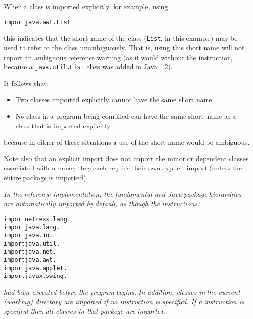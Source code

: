 When a class is imported explicitly, for example, using
\begin{alltt}
import java.awt.List
\end{alltt}
this indicates that the short name of the class (\texttt{List},
in this example) may be used to refer to the class unambiguously.
That is, using this short name will not report an ambiguous reference
warning (as it would without the  instruction, because
a \texttt{java.util.List} class was added in Java 1.2).
 
It follows that:
\begin{itemize}
\item Two classes imported explicitly cannot have the same short name.
\item No class in a program being compiled can have the same short name as
a class that is imported explicitly.
\end{itemize}
because in either of these situations a use of the short name would
be ambiguous.
 
Note also that an explicit import does not import the minor or dependent
classes associated with a name; they each require their own explicit
import (unless the entire package is imported).
 
\emph{In the reference implementation, the fundamental \nr{} and Java
package hierarchies are automatically imported by default, as though the
instructions:}
\begin{alltt}
import netrexx.lang.
import java.lang.
import java.io.
import java.util.
import java.net.
import java.awt.
import java.applet.
import javax.swing. 
\end{alltt}
\emph{had been executed before the program begins.
In addition, classes in the current (working) directory are imported if
no  instruction is specified.  If a 
instruction is specified then all classes in that package are imported.
}
